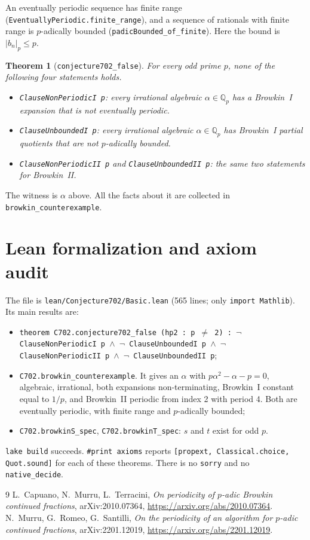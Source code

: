 \documentclass[11pt]{article}
\newtheorem{theorem}{Theorem}
\theoremstyle{definition}
\newcommand{\Q}{\mathbb{Q}}
\begin{document}
An eventually periodic sequence has finite range (\texttt{EventuallyPeriodic.finite\_range}), and a sequence
of rationals with finite range is $p$-adically bounded (\texttt{padicBounded\_of\_finite}). Here the bound is
$|b_n|_p\le p$.

\begin{theorem}[\texttt{conjecture702\_false}]
For every odd prime $p$, none of the following four statements holds.
\begin{itemize}
\item \texttt{ClauseNonPeriodicI p}: every irrational algebraic $\alpha\in\Q_p$ has a Browkin~I expansion
  that is not eventually periodic.
\item \texttt{ClauseUnboundedI p}: every irrational algebraic $\alpha\in\Q_p$ has Browkin~I partial
  quotients that are not $p$-adically bounded.
\item \texttt{ClauseNonPeriodicII p} and \texttt{ClauseUnboundedII p}: the same two statements for Browkin~II.
\end{itemize}
\end{theorem}
\noindent The witness is $\alpha$ above. All the facts about it are collected in
\texttt{browkin\_counterexample}.

\section{Lean formalization and axiom audit}
The file is \texttt{lean/Conjecture702/Basic.lean} (565 lines; only \texttt{import Mathlib}). Its main
results are:
\begin{itemize}
\item \texttt{theorem C702.conjecture702\_false (hp2 : p $\ne$ 2) : $\neg$ ClauseNonPeriodicI p $\wedge$
  $\neg$ ClauseUnboundedI p $\wedge$ $\neg$ ClauseNonPeriodicII p $\wedge$ $\neg$ ClauseUnboundedII p};
\item \texttt{C702.browkin\_counterexample}. It gives an $\alpha$ with $p\alpha^2-\alpha-p=0$, algebraic,
  irrational, both expansions non-terminating, Browkin~I constant equal to $1/p$, and Browkin~II
  periodic from index 2 with period 4. Both are eventually periodic, with finite range and
  $p$-adically bounded;
\item \texttt{C702.browkinS\_spec}, \texttt{C702.browkinT\_spec}: $s$ and $t$ exist for odd $p$.
\end{itemize}
\texttt{lake build} succeeds. \verb|#print axioms| reports \texttt{[propext, Classical.choice, Quot.sound]}
for each of these theorems. There is no \texttt{sorry} and no \texttt{native\_decide}.

\begin{thebibliography}{9}
 L.~Capuano, N.~Murru, L.~Terracini, \emph{On periodicity of $p$-adic Browkin continued
  fractions}, arXiv:2010.07364, \url{https://arxiv.org/abs/2010.07364}.
 N.~Murru, G.~Romeo, G.~Santilli, \emph{On the periodicity of an algorithm for $p$-adic
  continued fractions}, arXiv:2201.12019, \url{https://arxiv.org/abs/2201.12019}.
\end{thebibliography}
\end{document}
